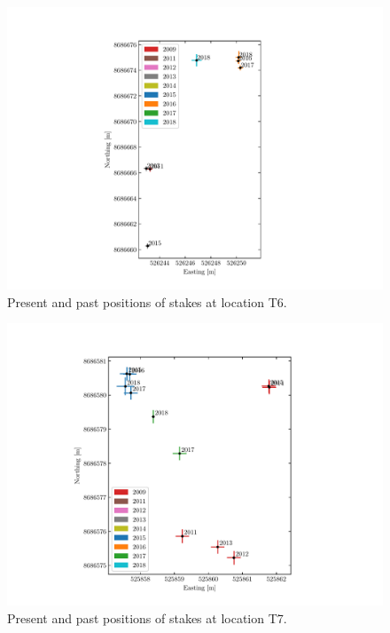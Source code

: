 \begin{figure}[H]
    \centering
    \includegraphics[width=.9\textwidth]{./figs/T6_2d.pdf}
    \caption{Present and past positions of stakes at location T6.}
    \label{GPS:fig:T6_2d}
\end{figure}

\begin{figure}[H]
    \centering
    \includegraphics[width=.9\textwidth]{./figs/T7_2d.pdf}
    \caption{Present and past positions of stakes at location T7.}
    \label{GPS:fig:T7_2d}
\end{figure}

